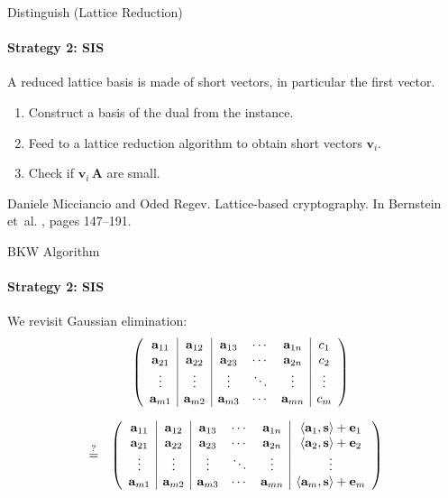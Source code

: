\documentclass[10pt,compress]{beamer}
\renewcommand{\vec}[1]{\mathbf{#1}\xspace}
\newcommand{\dotp}[2]{\ensuremath{\left\langle {#1},{#2}\right\rangle}\xspace}
\renewcommand{\vec}[1]{\mathbf{#1}\xspace}
\begin{document}
\begin{frame}{Distinguish (Lattice Reduction)}
  \framesubtitle{Strategy 2: SIS}

  A \alert{reduced lattice} basis is made of short vectors, in particular the first vector.
  \begin{enumerate}
  \item Construct a basis of the dual from the instance.
  \item Feed to a lattice reduction algorithm to obtain short vectors $\vec{v}_i$.
  \item Check if $\vec{v}_i\, \vec{A}$ are small.
  \end{enumerate}

  \begin{thebibliography}{99}
    Daniele Micciancio and Oded Regev.
    \newblock Lattice-based cryptography.
    \newblock In Bernstein et~al. \cite{PQCBook}, pages 147--191.
  \end{thebibliography}
\end{frame}


\begin{frame}[fragile]{BKW Algorithm}
  \framesubtitle{Strategy 2: SIS}

  We revisit Gaussian elimination:
  \begin{eqnarray*}
    & & \left(
        \begin{array}{c|c|ccc|c}
          \bold{a}_{11} & \bold{a}_{12} & \bold{a}_{13} & \cdots & \bold{a}_{1n} & c_1\\
          \bold{a}_{21} & \bold{a}_{22} & \bold{a}_{23} & \cdots & \bold{a}_{2n} & c_2\\
          \vdots & \vdots & \vdots & \ddots & \vdots & \vdots\\
          \bold{a}_{m1} & \bold{a}_{m2} & \bold{a}_{m3} & \cdots & \bold{a}_{mn} & c_{m}
        \end{array}
                                                                                   \right)
  \end{eqnarray*}

  \begin{eqnarray*}
    & \overset{?}{=} & \left(
                       \begin{array}{c|c|ccc|c}
                         \bold{a}_{11} & \bold{a}_{12} & \bold{a}_{13} & \cdots & \bold{a}_{1n} & \dotp{\vec{a}_1}{\vec{s}} + \vec{e}_1\\
                         \bold{a}_{21} & \bold{a}_{22} & \bold{a}_{23} & \cdots & \bold{a}_{2n} & \dotp{\vec{a}_2}{\vec{s}} + \vec{e}_2\\
                         \vdots & \vdots & \vdots & \ddots & \vdots & \vdots\\
                         \bold{a}_{m1} & \bold{a}_{m2} & \bold{a}_{m3} & \cdots & \bold{a}_{mn} & \dotp{\vec{a}_m}{\vec{s}} + \vec{e}_m
                       \end{array}\right)
  \end{eqnarray*}
\end{frame}
\end{document}
